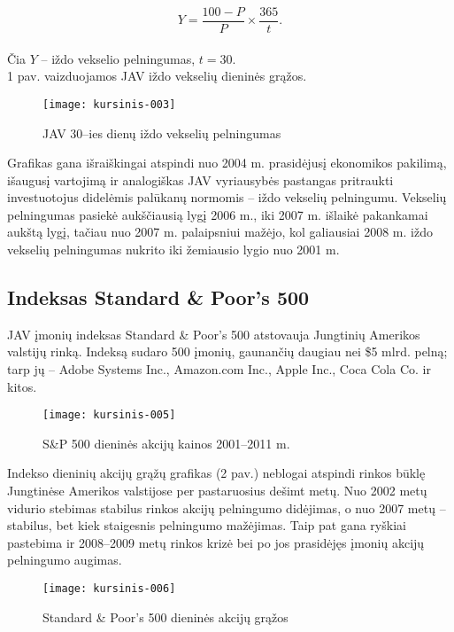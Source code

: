 \documentclass[12pt, a14paper, lithuanian]{article}
\begin{document}
$$Y = \frac{100 - P}{P} \times \frac{365}{t}.$$\\

Čia  $Y$ -- iždo vekselio pelningumas, $t = 30$. \\

1 pav. vaizduojamos JAV iždo vekselių dieninės grąžos.
   
\begin{figure}[H]
  \centering
\texttt{[image: kursinis-003]}
  \caption{JAV 30--ies dienų iždo vekselių pelningumas}
  \label{fig:1}
\end{figure}

Grafikas gana išraiškingai atspindi nuo 2004 m. prasidėjusį ekonomikos pakilimą, išaugusį vartojimą ir analogiškas
JAV vyriausybės pastangas pritraukti investuotojus didelėmis palūkanų normomis -- iždo vekselių pelningumu.
Vekselių pelningumas pasiekė aukščiausią lygį 2006 m., iki 2007 m. išlaikė pakankamai aukštą lygį, tačiau nuo 2007 m.
palaipsniui mažėjo, kol galiausiai 2008 m. iždo vekselių pelningumas nukrito iki žemiausio lygio nuo 2001 m. \\

\subsection{Indeksas Standard \& Poor's 500}

JAV įmonių indeksas Standard \& Poor's 500 atstovauja Jungtinių Amerikos valstijų
rinką. Indeksą sudaro 500 įmonių, gaunančių daugiau nei \$5 mlrd. pelną; tarp jų -- Adobe Systems Inc.,
Amazon.com Inc., Apple Inc., Coca Cola Co. ir kitos. \\


\begin{figure}[H]
  \centering
\texttt{[image: kursinis-005]}
  \caption{S\&P 500 dieninės akcijų kainos 2001--2011 m.}
  \label{fig:2}
\end{figure}

Indekso dieninių akcijų grąžų grafikas (2 pav.) neblogai atspindi rinkos būklę Jungtinėse Amerikos valstijose per pastaruosius dešimt metų. Nuo 2002 metų vidurio stebimas stabilus rinkos akcijų pelningumo didėjimas, o nuo 2007 metų -- stabilus, bet kiek staigesnis pelningumo mažėjimas.
Taip pat gana ryškiai pastebima ir 2008--2009 metų rinkos krizė bei po jos prasidėjęs įmonių akcijų pelningumo augimas.

\begin{figure}[H]
  \centering
\texttt{[image: kursinis-006]}
  \caption{Standard \& Poor's 500 dieninės akcijų grąžos}
  \label{fig:3}
\end{figure}
\end{document}

